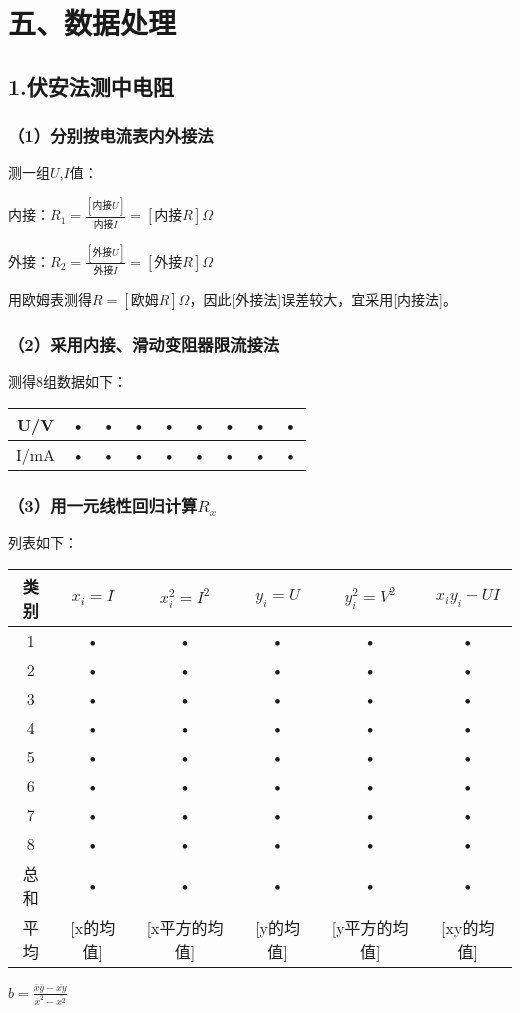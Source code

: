 \documentclass[11pt,a4paper,oneside]{article}
\begin{document}
\section{五、数据处理}

\subsection{1.伏安法测中电阻}

\subsubsection{（1）分别按电流表内外接法}
测一组$U$,$I$值：

内接：$R_1 = \displaystyle\frac{[内接U]}{内接I} = [内接R]\Omega $

外接：$R_2 = \displaystyle\frac{[外接U]}{外接I} = [外接R]\Omega $

用欧姆表测得$R = [欧姆R]\Omega$，因此[外接法]误差较大，宜采用[内接法]。

\subsubsection{（2）采用内接、滑动变阻器限流接法}
测得8组数据如下：

\begin{tabular}{|c|c|c|c|c|c|c|c|c|}
\hline 
U/V & • & • & • & • & • & • & • & • \\ 
\hline 
I/mA & • & • & • & • & • & • & • & • \\ 
\hline 
\end{tabular} 

\subsubsection{（3）用一元线性回归计算$R_x$}
列表如下：
\begin{tabular}{|c|c|c|c|c|c|}
\hline 
类别 & $x_i = I$ & $x_i^2 = I^2$ & $y_i=U$ & $y_i^2 = V^2$ & $x_i y_i-UI$ \\ 
\hline 
1 & • & • & • & • & • \\ 
\hline 
2 & • & • & • & • & • \\ 
\hline 
3 & • & • & • & • & • \\ 
\hline 
4 & • & • & • & • & • \\ 
\hline 
5 & • & • & • & • & • \\ 
\hline 
6 & • & • & • & • & • \\ 
\hline 
7 & • & • & • & • & • \\ 
\hline 
8 & • & • & • & • & • \\ 
\hline 
总和 & • & • & • & • & • \\ 
\hline 
平均 & [x的均值] & [x平方的均值] & [y的均值] & [y平方的均值] & [xy的均值] \\ 
\hline 
\end{tabular} 
$b = \displaystyle\frac{\bar{x}\bar{y}-\bar{xy}}{\bar{x}^2-\bar{x^2}}$
\end{document}
